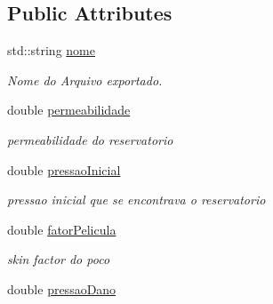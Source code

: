 \subsection*{Public Attributes}
\begin{DoxyCompactItemize}
\item 
\hypertarget{classCSimuladorAnaliseTestePressao_a840551f5e6d796b18f3036ba721563ee}{std\-::string \hyperlink{classCSimuladorAnaliseTestePressao_a840551f5e6d796b18f3036ba721563ee}{nome}}\label{classCSimuladorAnaliseTestePressao_a840551f5e6d796b18f3036ba721563ee}

\begin{DoxyCompactList}\small\item\em Nome do Arquivo exportado. \end{DoxyCompactList}\item 
\hypertarget{classCSimuladorAnaliseTestePressao_a19204e4ede4f658c53349e794382e542}{double \hyperlink{classCSimuladorAnaliseTestePressao_a19204e4ede4f658c53349e794382e542}{permeabilidade}}\label{classCSimuladorAnaliseTestePressao_a19204e4ede4f658c53349e794382e542}

\begin{DoxyCompactList}\small\item\em permeabilidade do reservatorio \end{DoxyCompactList}\item 
\hypertarget{classCSimuladorAnaliseTestePressao_a695f33f39e0bb2757c4cae1bfc1b3bd1}{double \hyperlink{classCSimuladorAnaliseTestePressao_a695f33f39e0bb2757c4cae1bfc1b3bd1}{pressao\-Inicial}}\label{classCSimuladorAnaliseTestePressao_a695f33f39e0bb2757c4cae1bfc1b3bd1}

\begin{DoxyCompactList}\small\item\em pressao inicial que se encontrava o reservatorio \end{DoxyCompactList}\item 
\hypertarget{classCSimuladorAnaliseTestePressao_ab528258b33e70123fa4767af665dba63}{double \hyperlink{classCSimuladorAnaliseTestePressao_ab528258b33e70123fa4767af665dba63}{fator\-Pelicula}}\label{classCSimuladorAnaliseTestePressao_ab528258b33e70123fa4767af665dba63}

\begin{DoxyCompactList}\small\item\em skin factor do poco \end{DoxyCompactList}\item 
\hypertarget{classCSimuladorAnaliseTestePressao_af666fb2636ecca426b94f600d627fa7e}{double \hyperlink{classCSimuladorAnaliseTestePressao_af666fb2636ecca426b94f600d627fa7e}{pressao\-Dano}}\label{classCSimuladorAnaliseTestePressao_af666fb2636ecca426b94f600d627fa7e}


\end{DoxyCompactItemize}
